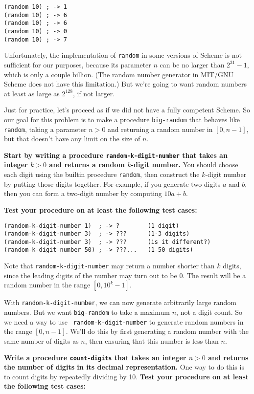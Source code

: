\begin{verbatim}
(random 10) ; -> 1
(random 10) ; -> 6
(random 10) ; -> 6
(random 10) ; -> 0
(random 10) ; -> 7
\end{verbatim}

Unfortunately, the implementation of {\tt random} in some versions of
Scheme is not sufficient for our purposes, because its parameter $n$
can be no larger than $2^{31}-1$, which is only a couple billion.
(The random number generator in MIT/GNU Scheme does not have this
limitation.)  But we're going to want random numbers at least as large
as $2^{128}$, if not larger.  

Just for practice, let's proceed as if we did not have a fully
competent Scheme.  So our goal for this problem is to make a procedure
{\tt big-random} that behaves like {\tt random}, taking a parameter
$n>0$ and returning a random number in $[0,n-1]$, but that doesn't
have any limit on the size of $n$.

{\bf Start by writing a procedure {\tt random-k-digit-number} that
  takes an integer $k>0$ and returns a random $k$-digit number.}  You
should choose each digit using the builtin procedure {\tt random},
then construct the $k$-digit number by putting those digits together.
For example, if you generate two digits $a$ and $b$, then you can form
a two-digit number by computing $10a + b$.

{\bf Test your procedure on at least the following test cases:}
\begin{verbatim}
(random-k-digit-number 1)  ; -> ?        (1 digit)
(random-k-digit-number 3)  ; -> ???      (1-3 digits)
(random-k-digit-number 3)  ; -> ???      (is it different?)
(random-k-digit-number 50) ; -> ???...   (1-50 digits)
\end{verbatim}

Note that {\tt random-k-digit-number} may return a number shorter than
$k$ digits, since the leading digits of the number may turn out to be
$0$.  The result will be a random number in the range $[0,10^k-1]$.

With {\tt random-k-digit-number}, we can now generate arbitrarily
large random numbers.  But we want {\tt big-random} to take a maximum
$n$, not a digit count.  So we need a way to use {\tt
  random-k-digit-number} to generate random numbers in the range
$[0,n-1]$.  We'll do this by first generating a random number with the
same number of digits as $n$, then ensuring that this number is less
than $n$.

{\bf Write a procedure {\tt count-digits} that takes an integer $n>0$
  and returns the number of digits in its decimal representation.}
  One way to do this is to count digits by repeatedly dividing by 10.
  {\bf Test your procedure on at least the following test cases:}

